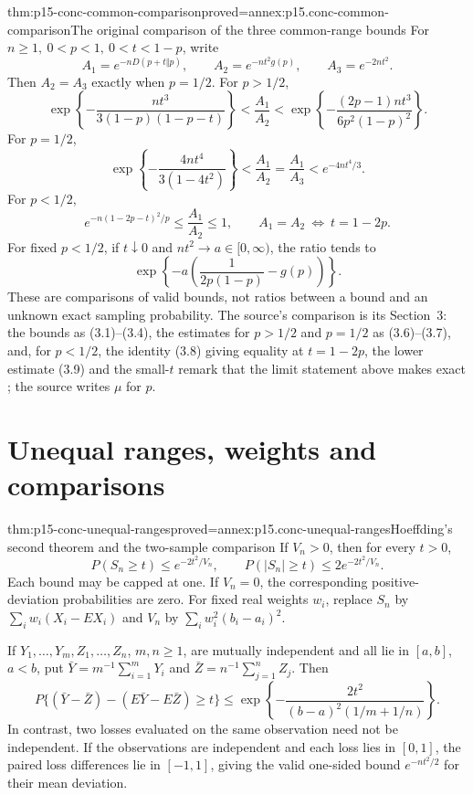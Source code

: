 \begin{hbtheorem}{thm:p15-conc-common-comparison}{proved=annex:p15.conc-common-comparison}{The original comparison of the three common-range bounds}
For \(n\geq1,\ 0<p<1,\ 0<t<1-p\), write
\[
 A_1=e^{-nD(p+t\Vert p)},\qquad
 A_2=e^{-nt^2g(p)},\qquad A_3=e^{-2nt^2}.
\]
Then \(A_2=A_3\) exactly when \(p=1/2\).
For \(p>1/2\),
\[
 \exp\!\left\{-\frac{nt^3}{3(1-p)(1-p-t)}\right\}
 <\frac{A_1}{A_2}<
 \exp\!\left\{-\frac{(2p-1)nt^3}{6p^2(1-p)^2}\right\}.
\]
For \(p=1/2\),
\[
 \exp\!\left\{-\frac{4nt^4}{3(1-4t^2)}\right\}
 <\frac{A_1}{A_2}=\frac{A_1}{A_3}
 <e^{-4nt^4/3}.
\]
For \(p<1/2\),
\[
       e^{-n(1-2p-t)^2/p}\leq\frac{A_1}{A_2}\leq1,
 \qquad A_1=A_2\ \Longleftrightarrow\ t=1-2p.
\]
For fixed \(p<1/2\), if \(t\downarrow0\) and
\(nt^2\to a\in[0,\infty)\), the ratio tends to
\[
       \exp\!\left\{-a\left(\frac1{2p(1-p)}-g(p)\right)\right\}.
\]
These are comparisons of valid bounds, not ratios between a bound
and an unknown exact sampling probability.
The source's comparison is its Section~3: the bounds as (3.1)--(3.4),
the estimates for \(p>1/2\) and \(p=1/2\) as (3.6)--(3.7), and, for
\(p<1/2\), the identity (3.8) giving equality at \(t=1-2p\), the lower
estimate (3.9) and the small-\(t\) remark that the limit statement above
makes exact \cite[pp.~18--19]{Hoeffding1963BoundedSums}; the source
writes \(\mu\) for \(p\).
\end{hbtheorem}

\section{Unequal ranges, weights and comparisons}

\begin{hbtheorem}{thm:p15-conc-unequal-ranges}{proved=annex:p15.conc-unequal-ranges}{Hoeffding's second theorem and the two-sample comparison}
If \(V_n>0\), then for every \(t>0\),
\[
 P(S_n\geq t)\leq e^{-2t^2/V_n},\qquad
 P(|S_n|\geq t)\leq 2e^{-2t^2/V_n}.
\]
Each bound may be capped at one. If \(V_n=0\), the
corresponding positive-deviation probabilities are zero.
For fixed real weights \(w_i\), replace \(S_n\) by
\(\sum_iw_i(X_i-EX_i)\) and \(V_n\) by
\(\sum_iw_i^2(b_i-a_i)^2\).

If \(Y_1,\ldots,Y_m,Z_1,\ldots,Z_n\), \(m,n\geq1\), are mutually
independent and all lie in \([a,b]\), \(a<b\), put
\(\bar Y=m^{-1}\sum_{i=1}^mY_i\) and
\(\bar Z=n^{-1}\sum_{j=1}^nZ_j\). Then
\[
 P\{(\bar Y-\bar Z)-(E\bar Y-E\bar Z)\geq t\}
 \leq
 \exp\!\left\{-\frac{2t^2}{(b-a)^2(1/m+1/n)}\right\}.
\]
In contrast, two losses evaluated on the same observation need
not be independent. If the observations are independent and each
loss lies in \([0,1]\), the paired loss differences lie in
\([-1,1]\), giving the valid one-sided bound
\(e^{-nt^2/2}\) for their mean deviation.
\end{hbtheorem}

